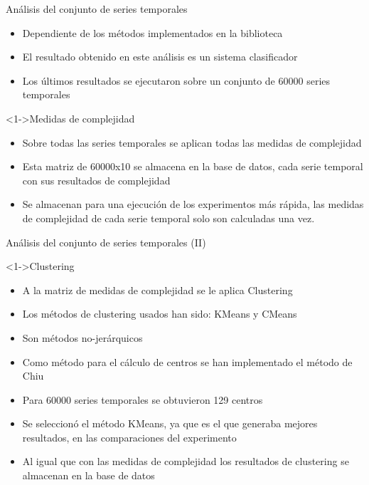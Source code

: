 \begin{tframe}{Análisis del conjunto de series temporales}
	\begin{itemize}
		\item Dependiente de los métodos implementados en la biblioteca
		\item El resultado obtenido en este análisis es un sistema clasificador
		\item Los últimos resultados se ejecutaron sobre un conjunto de 60000 series temporales
	\end{itemize}
	\begin{block}<1->{Medidas de complejidad}
		\begin{itemize}
			\item<+-| alert@+> Sobre todas las series temporales se aplican todas las medidas de complejidad
			\item<+-| alert@+> Esta matriz de 60000x10 se almacena en la base de datos, cada serie temporal con sus resultados de complejidad
			\item<+-| alert@+> Se almacenan para una ejecución de los experimentos más rápida, las medidas de complejidad de cada serie temporal solo son calculadas una vez.
		\end{itemize}
	\end{block}
\end{tframe}

\begin{tframe}{Análisis del conjunto de series temporales (II)}
	\begin{block}<1->{Clustering}
		\begin{itemize}
			\item<+-| alert@+> A la matriz de medidas de complejidad se le aplica Clustering
			\item<+-| alert@+> Los métodos de clustering usados han sido: KMeans y CMeans
			\item<+-| alert@+> Son métodos no-jerárquicos
			\item<+-| alert@+> Como método para el cálculo de centros se han implementado el método de Chiu
			\item<+-| alert@+> Para 60000 series temporales se obtuvieron 129 centros
			\item<+-| alert@+> Se seleccionó el método KMeans, ya que es el que generaba mejores resultados, en las comparaciones del experimento
			\item<+-| alert@+> Al igual que con las medidas de complejidad los resultados de clustering se almacenan en la base de datos
		\end{itemize}
	\end{block}
\end{tframe}

